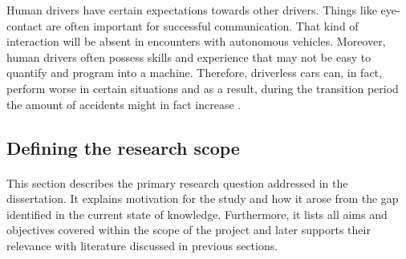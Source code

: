 \documentclass[11pt,english]{article}
\begin{document}
\par
Human drivers have certain expectations towards other drivers. Things like eye-contact are often important for successful communication. That kind of interaction will be absent in encounters with autonomous vehicles. Moreover, human drivers often possess skills and experience that may not be easy to quantify and program into a machine. Therefore, driverless cars can, in fact, perform worse in certain situations and as a result, during the transition period the amount of accidents might in fact increase \citep{sivak2015road}.





















\subsection{Defining the research scope}

\paragraph{}
This section describes the primary research question addressed in the dissertation. It explains motivation for the study and how it arose from the gap identified in the current state of knowledge. Furthermore, it lists all aims and objectives covered within the scope of the project and later supports their relevance with literature discussed in previous sections.
\end{document}
